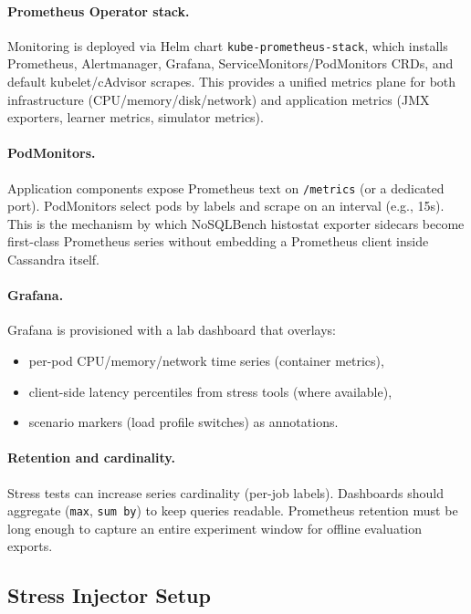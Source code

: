 \documentclass[11pt,a4paper]{article}
\begin{document}
\paragraph{Prometheus Operator stack.}
Monitoring is deployed via Helm chart \texttt{kube-prometheus-stack}, which installs Prometheus, Alertmanager, Grafana, ServiceMonitors/PodMonitors CRDs, and default kubelet/cAdvisor scrapes. This provides a unified metrics plane for both infrastructure (CPU/memory/disk/network) and application metrics (JMX exporters, learner metrics, simulator metrics).

\paragraph{PodMonitors.}
Application components expose Prometheus text on \texttt{/metrics} (or a dedicated port). PodMonitors select pods by labels and scrape on an interval (e.g., 15s). This is the mechanism by which NoSQLBench histostat exporter sidecars become first-class Prometheus series without embedding a Prometheus client inside Cassandra itself.

\paragraph{Grafana.}
Grafana is provisioned with a lab dashboard that overlays:
\begin{itemize}[leftmargin=*]
  \item per-pod CPU/memory/network time series (container metrics),
  \item client-side latency percentiles from stress tools (where available),
  \item scenario markers (load profile switches) as annotations.
\end{itemize}

\paragraph{Retention and cardinality.}
Stress tests can increase series cardinality (per-job labels). Dashboards should aggregate (\texttt{max}, \texttt{sum by}) to keep queries readable. Prometheus retention must be long enough to capture an entire experiment window for offline evaluation exports.

\subsection{Stress Injector Setup}
\label{subsec:stress}
\end{document}
